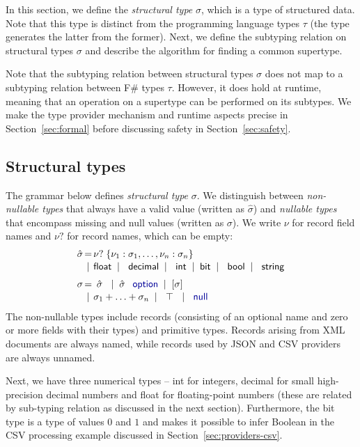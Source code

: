 \documentclass[preprint]{sigplanconf}
\newcommand{\kvd}[1]{\textnormal{\textcolor{kvdclr}{\sffamily #1}}}
\newcommand{\ident}[1]{\textnormal{\sffamily #1}}
\newcommand{\lsep}[0]{\;\; | \;\;}
\newcommand{\narrow}[1]{\hspace{-0.85em} #1 \hspace{-0.85em}}
\begin{document}
In this section, we define the \emph{structural type} $\sigma$, which is a type of structured data.
Note that this type is distinct from the programming language types $\tau$ (the type generates the
latter from the former). Next, we define the subtyping relation on structural types $\sigma$ and 
describe the algorithm for finding a common supertype. 

Note that the subtyping relation between structural types $\sigma$ does not map to a subtyping 
relation between F\#  types $\tau$. However, it does hold at runtime, meaning that an operation on 
a supertype can be performed on its subtypes. We make the type provider mechanism and runtime aspects 
precise in Section~\ref{sec:formal} before discussing safety in Section~\ref{sec:safety}.

\subsection{Structural types}
\label{sec:inference-types}

The grammar below defines \emph{structural type} $\sigma$. We distinguish between \emph{non-nullable types}
that always have a valid value (written as $\hat{\sigma}$) and \emph{nullable types} that encompass missing 
and \kvd{null} values (written as $\sigma$). We write $\nu$ for record field names and $\nu?$
for record names, which can be empty:
%
\begin{equation*}
\begin{array}{rcl}
 \hat{\sigma} &\narrow{=}& \nu?\; \{ \nu_1 : \sigma_1, \ldots, \nu_n : \sigma_n \} \\[0.1em]
                &\narrow{|}& \ident{float} \lsep \ident{decimal} \lsep \ident{int} \lsep \ident{bit} \lsep \ident{bool} \lsep \ident{string} 
 \\[0.6em] 
       \sigma &\narrow{=}& ~\hat{\sigma}~ \lsep \hat{\sigma}\;\,\kvd{option} \lsep [\sigma] \\[0.1em]
              &\narrow{|}& \sigma_1 + \ldots + \sigma_n \lsep ~\top~ \lsep \kvd{null}
\end{array}
\end{equation*}
%
The non-nullable types include records (consisting of an optional name and zero or more fields with
their types) and primitive types. Records arising from XML documents are always named, while records
used by JSON and CSV providers are always unnamed. 

Next, we have three numerical types -- \ident{int} for integers, \ident{decimal} for small high-precision 
decimal numbers and \ident{float} for floating-point numbers (these are related by sub-typing relation as
discussed in the next section). Furthermore, the \ident{bit} type is a type of values $0$ and $1$ and 
makes it possible to infer Boolean in the CSV processing example discussed in Section~\ref{sec:providers-csv}.
\end{document}
